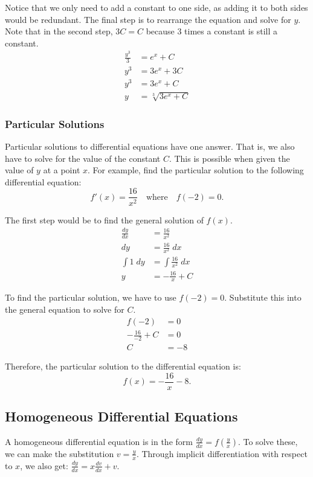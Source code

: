 \documentclass[12pt]{article}
\begin{document}
\noindent Notice that we only need to add a constant to one side, as adding it to both sides would be redundant. The final step is to rearrange the equation and solve for $y$. Note that in the second step, $3C = C$ because $3$ times a constant is still a constant.
\begin{align*}
	\frac{y^3}{3} &= e^x + C \\[5pt]
	y^3 &= 3e^x + 3C \\
	y^3 &= 3e^x + C \\
	y &= \sqrt[3]{3e^x + C}
\end{align*}

\subsubsection{Particular Solutions}
Particular solutions to differential equations have one answer. That is, we also have to solve for the value of the constant $C$. This is possible when given the value of $y$ at a point $x$. For example, find the particular solution to the following differential equation:
\[ f'(x) = \frac{16}{x^2} \quad \text{where} \quad f(-2) = 0. \]

\noindent The first step would be to find the general solution of $f(x)$.
\begin{align*}
	\frac{dy}{dx} &= \frac{16}{x^2} \\[5pt]
	dy &= \frac{16}{x^2} \; dx \\[5pt]
	\int 1 \; dy &= \int \frac{16}{x^2} \; dx \\[5pt]
	y &= -\frac{16}{x} + C
\end{align*}

\noindent To find the particular solution, we have to use $f(-2) = 0$. Substitute this into the general equation to solve for $C$.
\begin{align*}
	f(-2) &= 0 \\
	-\frac{16}{-2} + C &= 0 \\[5pt]
	C &= -8
\end{align*}

\noindent Therefore, the particular solution to the differential equation is:
\[ f(x) = -\frac{16}{x} - 8. \]

\subsection{Homogeneous Differential Equations}
A homogeneous differential equation is in the form $\frac{dy}{dx} = f \left( \frac{y}{x} \right)$. To solve these, we can make the substitution $v = \frac{y}{x}$. Through implicit differentiation with respect to $x$, we also get: $\frac{dy}{dx} = x \frac{dv}{dx} + v$.
\end{document}
